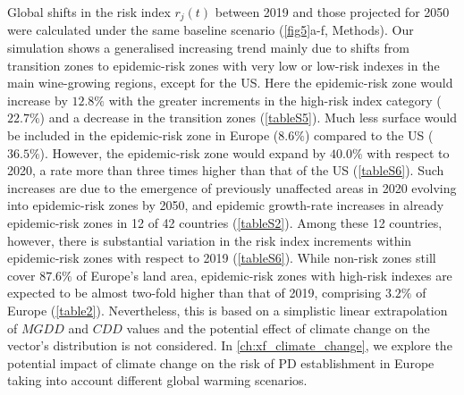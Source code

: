     Global shifts in the risk index $r_j(t)$ between 2019 and those projected
    for 2050 were calculated under the same baseline scenario (\cref{fig5}a-f,
    Methods). Our simulation shows a generalised increasing trend mainly due to
    shifts from transition zones to epidemic-risk zones with very low or
    low-risk indexes in the main wine-growing regions, except for the US. Here
    the epidemic-risk zone would increase by $12.8\%$ with the greater
    increments in the high-risk index category ($22.7\%$) and a decrease in the
    transition zones (\cref{tableS5}). Much less surface would be
    included in the epidemic-risk zone in Europe ($8.6\%$) compared to the US
    ($36.5\%$). However, the epidemic-risk zone would expand by $40.0\%$ with
    respect to 2020, a rate more than three times higher than
    that of the US (\cref{tableS6}). Such increases are due to the
    emergence of previously unaffected areas in 2020 evolving into
    epidemic-risk zones by 2050, and epidemic growth-rate increases in already
    epidemic-risk zones in 12 of 42 countries (\cref{tableS2}). Among
    these 12 countries, however, there is substantial variation in the risk
    index increments within epidemic-risk zones with respect to 2019
    (\cref{tableS6}). While non-risk zones still cover $87.6\%$ of
    Europe's land area, epidemic-risk zones with high-risk indexes are expected
    to be almost two-fold higher than that of 2019, comprising $3.2\%$ of
    Europe (\cref{table2}). Nevertheless, this is based on a simplistic
    linear extrapolation of $MGDD$ and $CDD$ values and the potential effect of
    climate change on the vector's distribution is not considered. In
    \cref{ch:xf_climate_change}, we explore the potential impact of climate
    change on the risk of PD establishment in Europe taking into account
    different global warming scenarios.

